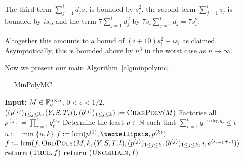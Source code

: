 The third term $\sum_{j=1}^i d_j s_j$ is bounded by $s_i^2$,
the second term $\sum_{j=1}^i s_j$ is bounded by $is_i$, and the term
$7 \sum_{j=1}^i d_j^2$ by $7s_i\sum_{j=1}^i d_j = 7s_i^2$.

Altogether this amounts to a bound of $(i+10)s_i^2 + is_i$ as claimed.
Asymptotically, this is bounded above by $n^3$ in the worst case as
$n \to \infty$.

\proofend

\smallskip
Now we present our main Algorithm~\ref{algminpolymc}. 

\begin{algorithm}
\caption{$\quad$ \sc MinPolyMC}
\label{algminpolymc}
\begin{algorithmic}
\STATE \textbf{Input:} $M \in \mathbb{F}_q^{n \times n}$, $0 < \epsilon < 1/2$.
\STATE \hspace*{0mm} %
       $((p^{(j)})_{1 \le j \le k},(Y,S,T,l),(b^{(j)})_{1 \le j \le k})
       := \mbox{\sc CharPoly}(M)$
\vspace*{2mm}
\STATE Factorise all $p^{(j)} = \prod_{r=1}^t q_r^{e_{j,r}}$ 
\STATE Determine the least $u \in \mathbb{N}$ such that
 $\sum_{r=1}^t q^{-u\deg q_r} \le \epsilon$
\STATE $u := \min\{ u,k \}$
\STATE $f := \lcm(p^{(1)}, \ldots, p^{(k)})$ 
    \STATE $f := \mathrm{lcm}(f,\mbox{\sc OrdPoly}
           (M,k,(Y,S,T,l),(p^{(j)})_{1 \le j \le k}, 
           (b^{(j)})_{1 \le j \le k},i,e^{(s_{i-1}+1)}))$
\ENDFOR
{}
    \STATE \textbf{return} $(\mbox{\sc True},f)$
\ELSE
    \STATE \textbf{return} $(\mbox{\sc Uncertain},f)$
\ENDIF
\end{algorithmic}
\end{algorithm}

